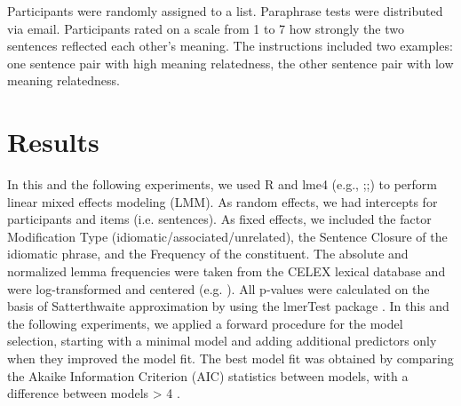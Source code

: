 \documentclass[output=paper]{langsci/langscibook}
\begin{document}
Participants were randomly assigned to a list. Paraphrase tests were distributed via email. Participants rated on a scale from 1 to 7 how strongly the two sentences reflected each other’s meaning. The instructions included two examples: one sentence pair with high meaning relatedness, the other sentence pair with low meaning relatedness. 

\section{Results}

In this and the following experiments, we used R \citep{rCore:2012} and lme4 (e.g., \citet{bates:2005};\citet{bates:2012};\citet{baayen:2008}) to perform linear mixed effects modeling (LMM). As random effects, we had intercepts for participants and items (i.e. sentences). As fixed effects, we included the factor Modification Type (idiomatic/associated/unrelated), the Sentence Closure of the idiomatic phrase, and the Frequency of the constituent. The absolute and normalized lemma frequencies were taken from the CELEX lexical database \citep{baayen:1993} and were log-transformed and centered (e.g. \citet{winter:2013}). All p-values were calculated on the basis of Satterthwaite approximation by using the lmerTest package \citep{kuznetsova:2015}. In this and the following experiments, we applied a forward procedure for the model selection, starting with a minimal model and adding additional predictors only when they improved the model fit. The best model fit was obtained by comparing the Akaike Information Criterion (AIC) statistics between models, with a difference between models > 4 \citep{sakamoto:1986}. 


\begin{table}[]
\caption{\textit{Fixed Effects of the Predictors in the Linear Mixed-Effect Model for the Paraphrase Ratings in Experiment 1.}}
\label{tab:linear}
\end{table}
\end{document}
